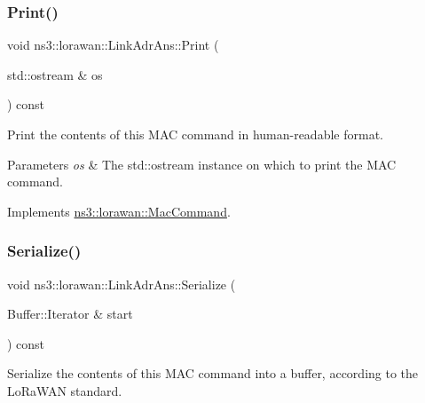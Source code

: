 \mbox{\label{classns3_1_1lorawan_1_1LinkAdrAns_a91434c73f73c48f60c1fa2226278ca99}} 
\subsubsection{\texorpdfstring{Print()}{Print()}}
{\footnotesize\ttfamily void ns3\+::lorawan\+::\+Link\+Adr\+Ans\+::\+Print (\begin{DoxyParamCaption}\item[{std\+::ostream \&}]{os }\end{DoxyParamCaption}) const\hspace{0.3cm}{\ttfamily [virtual]}}

Print the contents of this M\+AC command in human-\/readable format.


\begin{DoxyParams}{Parameters}
{\em os} & The std\+::ostream instance on which to print the M\+AC command. \\
\hline
\end{DoxyParams}


Implements \hyperlink{classns3_1_1lorawan_1_1MacCommand_a6bf88db38dab7dcd817811a9fb59f920}{ns3\+::lorawan\+::\+Mac\+Command}.

\mbox{\label{classns3_1_1lorawan_1_1LinkAdrAns_a057b6fc123d090cdd835c90760a883ca}} 
\subsubsection{\texorpdfstring{Serialize()}{Serialize()}}
{\footnotesize\ttfamily void ns3\+::lorawan\+::\+Link\+Adr\+Ans\+::\+Serialize (\begin{DoxyParamCaption}\item[{Buffer\+::\+Iterator \&}]{start }\end{DoxyParamCaption}) const\hspace{0.3cm}{\ttfamily [virtual]}}

Serialize the contents of this M\+AC command into a buffer, according to the Lo\+Ra\+W\+AN standard.


